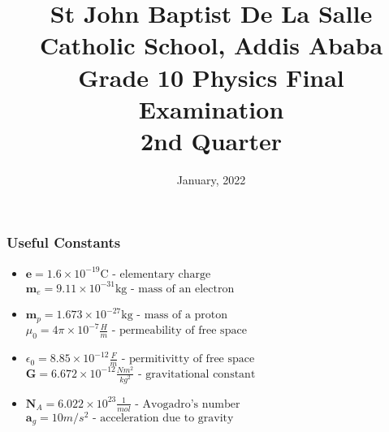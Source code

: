 \documentclass[13pt,addpoints]{exam}
\date{January, 2022}\usepackage{geometry}
\begin{document}
	\title{St John Baptist De La Salle Catholic School, Addis Ababa\\
		\large Grade 10 Physics Final Examination \\
		2nd Quarter}
	\maketitle
	\begin{center}
		\subsubsection*{Useful Constants}
		\begin{itemize}
			\item $\textbf{e}=1.6\times10^{-19}\text{C}\text{  - elementary charge}$ \textbf{~}  $\textbf{m}_e=9.11\times10^{-31}\text{kg}\text{  - mass of an electron}$
			\item $\textbf{m}_p=1.673\times10^{-27}\text{kg}\text{  - mass of a proton}$ \textbf{~}$\mu_0=4\pi\times10^{-7}\frac{H}{m}\text{  - permeability of free space}$
			\item $\epsilon_0=8.85\times10^{-12}\frac{F}{m}\text{  - permitivitty of free space}$\textbf{~}$\textbf{G} = 6.672\times10^{-12}\frac{Nm^2}{kg^2}\text{  - gravitational constant}$
			\item $\textbf{N}_A = 6.022\times10^{23}\frac{1}{mol}\text{  - Avogadro's number}$$\textbf{~}$$\textbf{a}_g=10m/s^2\text{  - acceleration due to gravity}$
		\end{itemize}
	\end{center}
\end{document}
